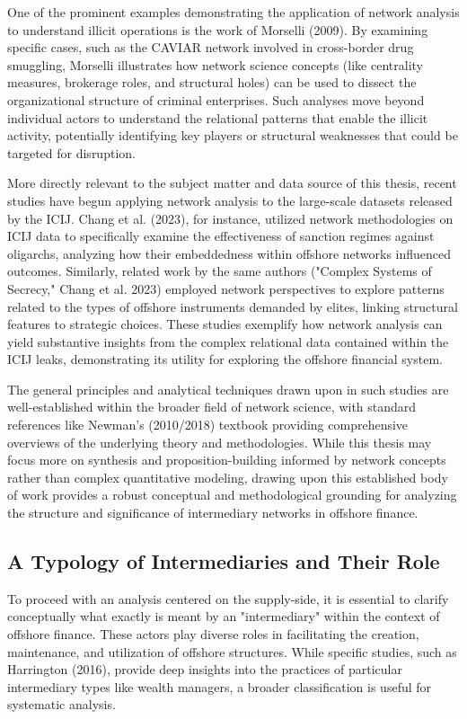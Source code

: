 One of the prominent examples demonstrating the application of network analysis to understand illicit operations is the work of Morselli (2009). By examining specific cases, such as the CAVIAR network involved in cross-border drug smuggling, Morselli illustrates how network science concepts (like centrality measures, brokerage roles, and structural holes) can be used to dissect the organizational structure of criminal enterprises. Such analyses move beyond individual actors to understand the relational patterns that enable the illicit activity, potentially identifying key players or structural weaknesses that could be targeted for disruption.

More directly relevant to the subject matter and data source of this thesis, recent studies have begun applying network analysis to the large-scale datasets released by the ICIJ. Chang et al. (2023), for instance, utilized network methodologies on ICIJ data to specifically examine the effectiveness of sanction regimes against oligarchs, analyzing how their embeddedness within offshore networks influenced outcomes. Similarly, related work by the same authors ("Complex Systems of Secrecy," Chang et al. 2023) employed network perspectives to explore patterns related to the types of offshore instruments demanded by elites, linking structural features to strategic choices. These studies exemplify how network analysis can yield substantive insights from the complex relational data contained within the ICIJ leaks, demonstrating its utility for exploring the offshore financial system.

The general principles and analytical techniques drawn upon in such studies are well-established within the broader field of network science, with standard references like Newman's (2010/2018) textbook providing comprehensive overviews of the underlying theory and methodologies. While this thesis may focus more on synthesis and proposition-building informed by network concepts rather than complex quantitative modeling, drawing upon this established body of work provides a robust conceptual and methodological grounding for analyzing the structure and significance of intermediary networks in offshore finance.

\subsection{A Typology of Intermediaries and Their Role}
\label{subsec:2_1_4}

To proceed with an analysis centered on the supply-side, it is essential to clarify conceptually what exactly is meant by an "intermediary" within the context of offshore finance. These actors play diverse roles in facilitating the creation, maintenance, and utilization of offshore structures. While specific studies, such as Harrington (2016), provide deep insights into the practices of particular intermediary types like wealth managers, a broader classification is useful for systematic analysis.

